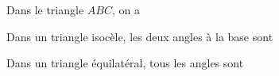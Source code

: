 \documentclass[12pt,a4paper]{article}
\begin{document}
\begin{myexs}
\begin{multicols}{2}
\begin{center}
		\end{center}
	\end{multicols}
\end{myexs}

\begin{myexs}
	\begin{multicols}{2}
		\vspace*{1cm}
		Dans le triangle $ABC$, on a \\ %
		\vspace*{1cm}
		
		
		Dans un triangle isocèle, les deux angles à la base sont %
		\vspace*{2.5cm}
		
		
		Dans un triangle équilatéral, tous les angles sont %
		

\end{multicols}
\end{myexs}
\end{document}
